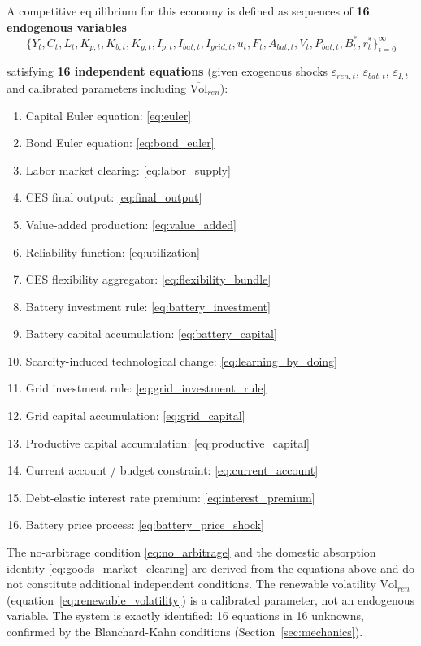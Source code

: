 \documentclass[12pt, a4paper]{article}
\begin{document}
A competitive equilibrium for this economy is defined as sequences of \textbf{16 endogenous variables}
$$\{Y_t, C_t, L_t, K_{p,t}, K_{b,t}, K_{g,t}, I_{p,t}, I_{bat,t}, I_{grid,t}, u_t, F_t, A_{bat,t}, V_t, P_{bat,t}, B^*_t, r^*_t\}_{t=0}^{\infty}$$

satisfying \textbf{16 independent equations} (given exogenous shocks $\varepsilon_{ren,t}$, $\varepsilon_{bat,t}$, $\varepsilon_{I,t}$ and calibrated parameters including $\overline{\text{Vol}}_{ren}$):

\begin{enumerate}
    \item Capital Euler equation: \eqref{eq:euler}
    \item Bond Euler equation: \eqref{eq:bond_euler}
    \item Labor market clearing: \eqref{eq:labor_supply}
    \item CES final output: \eqref{eq:final_output}
    \item Value-added production: \eqref{eq:value_added}
    \item Reliability function: \eqref{eq:utilization}
    \item CES flexibility aggregator: \eqref{eq:flexibility_bundle}
    \item Battery investment rule: \eqref{eq:battery_investment}
    \item Battery capital accumulation: \eqref{eq:battery_capital}
    \item Scarcity-induced technological change: \eqref{eq:learning_by_doing}
    \item Grid investment rule: \eqref{eq:grid_investment_rule}
    \item Grid capital accumulation: \eqref{eq:grid_capital}
    \item Productive capital accumulation: \eqref{eq:productive_capital}
    \item Current account / budget constraint: \eqref{eq:current_account}
    \item Debt-elastic interest rate premium: \eqref{eq:interest_premium}
    \item Battery price process: \eqref{eq:battery_price_shock}
\end{enumerate}

\noindent The no-arbitrage condition \eqref{eq:no_arbitrage} and the domestic absorption identity \eqref{eq:goods_market_clearing} are derived from the equations above and do not constitute additional independent conditions. The renewable volatility $\overline{\text{Vol}}_{ren}$ (equation~\ref{eq:renewable_volatility}) is a calibrated parameter, not an endogenous variable. The system is exactly identified: 16 equations in 16 unknowns, confirmed by the Blanchard-Kahn conditions (Section~\ref{sec:mechanics}).
\end{document}

